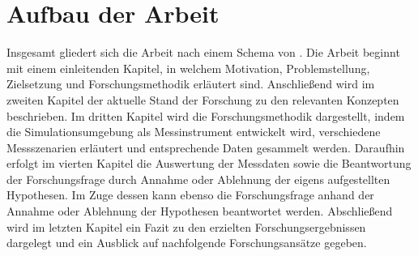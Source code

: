 \section{Aufbau der Arbeit}

Insgesamt gliedert sich die Arbeit nach einem Schema von \cite[]{Holzweiig.2022}.
Die Arbeit beginnt mit einem einleitenden Kapitel, in welchem Motivation, Problemstellung, Zielsetzung und Forschungsmethodik erläutert sind.
Anschließend wird im zweiten Kapitel der aktuelle Stand der Forschung zu den relevanten Konzepten beschrieben.
Im dritten Kapitel wird die Forschungsmethodik dargestellt, indem die Simulationsumgebung als Messinstrument entwickelt wird, verschiedene Messszenarien erläutert und entsprechende Daten gesammelt werden. 
Daraufhin erfolgt im vierten Kapitel die Auswertung der Messdaten sowie die Beantwortung der Forschungsfrage durch Annahme oder Ablehnung der eigens aufgestellten Hypothesen.
Im Zuge dessen kann ebenso die Forschungsfrage anhand der Annahme oder Ablehnung der Hypothesen beantwortet werden.
Abschließend wird im letzten Kapitel ein Fazit zu den erzielten Forschungsergebnissen dargelegt und ein Ausblick auf nachfolgende Forschungsansätze gegeben.
